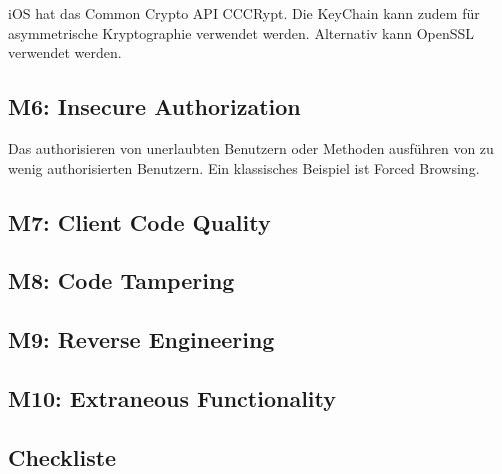 iOS hat das Common Crypto API CCCRypt. Die KeyChain kann zudem für asymmetrische Kryptographie verwendet werden. Alternativ kann OpenSSL verwendet werden.

\subsection{M6: Insecure Authorization}
Das authorisieren von unerlaubten Benutzern oder Methoden ausführen von zu wenig authorisierten Benutzern. Ein klassisches Beispiel ist Forced Browsing.

\subsection{M7: Client Code Quality}


\subsection{M8: Code Tampering}

\subsection{M9: Reverse Engineering}

\subsection{M10: Extraneous Functionality}
\subsection{Checkliste}

